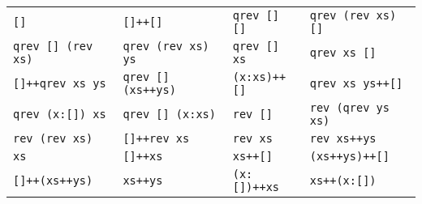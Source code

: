 \newcommand\vb[1]{{\tt #1}}

\begin{tabular}{>{\footnotesize}l >{\footnotesize}l >{\footnotesize}l >{\footnotesize}l}
\vb{[]}&
\vb{[]++[]}&
\vb{qrev [] []}&
\vb{qrev (rev xs) []}\\
\vb{qrev [] (rev xs)}&
\vb{qrev (rev xs) ys}&
\vb{qrev [] xs}&
\vb{qrev xs []}\\
\vb{[]++qrev xs ys}&
\vb{qrev [] (xs++ys)}&
\vb{(x:xs)++[]}&
\vb{qrev xs ys++[]}\\
\vb{qrev (x:[]) xs}&
\vb{qrev [] (x:xs)}&
\vb{rev []}&
\vb{rev (qrev ys xs)}\\
\vb{rev (rev xs)}&
\vb{[]++rev xs}&
\vb{rev xs}&
\vb{rev xs++ys}\\
\vb{xs}&
\vb{[]++xs}&
\vb{xs++[]}&
\vb{(xs++ys)++[]}\\
\vb{[]++(xs++ys)}&
\vb{xs++ys}&
\vb{(x:[])++xs}&
\vb{xs++(x:[])}
\end{tabular}
